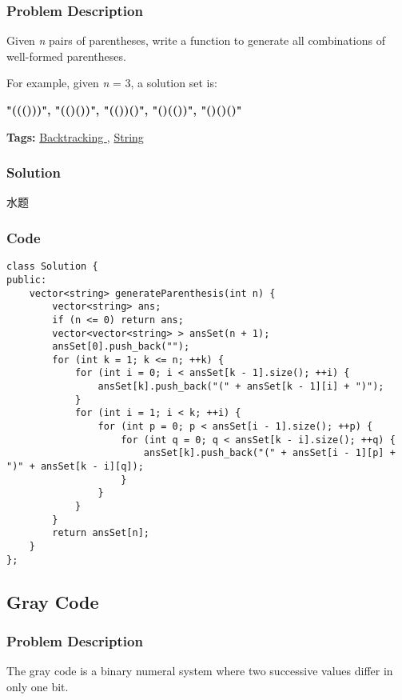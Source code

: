 \documentclass{article}
\begin{document}
\begin{CJK*}{UTF8}{gkai}
\subsubsection*{Problem Description}
Given \emph{n} pairs of parentheses, write a function to generate all combinations of well-formed parentheses.

For example, given \emph{n} = 3, a solution set is:

\textbf{"((()))", "(()())", "(())()", "()(())", "()()()"}


\textbf{Tags: }
\hyperref[ Backtracking ]{ Backtracking },  \hyperref[ String ]{ String }



\subsubsection*{Solution}
水题

\subsubsection*{Code}
\begin{lstlisting}
class Solution {
public:
    vector<string> generateParenthesis(int n) {
        vector<string> ans;
        if (n <= 0) return ans;
        vector<vector<string> > ansSet(n + 1);
        ansSet[0].push_back("");
        for (int k = 1; k <= n; ++k) {
            for (int i = 0; i < ansSet[k - 1].size(); ++i) {
                ansSet[k].push_back("(" + ansSet[k - 1][i] + ")");
            }
            for (int i = 1; i < k; ++i) {
                for (int p = 0; p < ansSet[i - 1].size(); ++p) {
                    for (int q = 0; q < ansSet[k - i].size(); ++q) {
                        ansSet[k].push_back("(" + ansSet[i - 1][p] + ")" + ansSet[k - i][q]);
                    }
                }
            }
        }
        return ansSet[n];
    }
}; 
\end{lstlisting}


\subsection{ Gray Code }
\label{ Gray Code }

\subsubsection*{Problem Description}
The gray code is a binary numeral system where two successive values differ in only one bit.


\end{CJK*}
\end{document}
